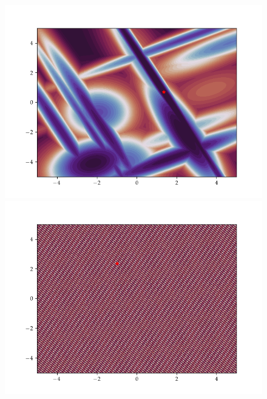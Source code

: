 \begin{figure}[h]
    \begin{minipage}[b]{0.32\textwidth}
        \includegraphics[trim=2.5cm 1.3cm 2.5cm 1.3cm,clip,width=\textwidth]{Figures/coco/f22.png}
    \end{minipage}
    \hfill
    \begin{minipage}[b]{0.32\textwidth}
      \includegraphics[trim=2.5cm 1.3cm 2.5cm 1.3cm,clip,width=\textwidth]{Figures/coco/f23.png}
    \end{minipage}
    \hfill
    \begin{minipage}[b]{0.32\textwidth}

\end{minipage}
\end{figure}
